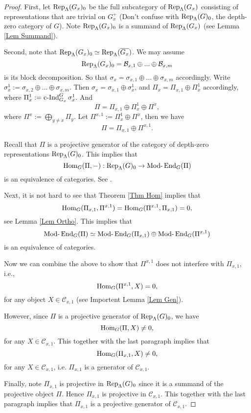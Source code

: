 	\begin{proof}
		First, let $\operatorname{\operatorname{Rep}}_{\Lambda}(G_x)_0$ be the full subcategory of $\operatorname{\operatorname{Rep}}_{\Lambda}(G_x)$ consisting of representations that are trivial on $G_x^+$ (Don't confuse with $\operatorname{\operatorname{Rep}}_{\Lambda}(G)_0$, the depth-zero category of $G$). Note $\operatorname{\operatorname{Rep}}_{\Lambda}(G_x)_0$ is a summand of $\operatorname{\operatorname{Rep}}_{\Lambda}(G_x)$ (see Lemma \ref{Lem Summand}).
		
		Second, note that $\operatorname{\operatorname{Rep}}_{\Lambda}(G_x)_0 \simeq \operatorname{\operatorname{Rep}}_{\Lambda}(\overline{G_x})$. We may assume $$\operatorname{\operatorname{Rep}}_{\Lambda}(G_x)_0=\mathcal{B}_{x,1} \oplus ... \oplus \mathcal{B}_{x,m}$$
		is its block decomposition. So that $\sigma_x=\sigma_{x,1}\oplus...\oplus\sigma_{x,m}$ accordingly. Write $\sigma_x^1:=\sigma_{x,2}\oplus...\oplus\sigma_{x,m}$. Then $\sigma_x=\sigma_{x,1} \oplus \sigma_x^1$, and $\Pi_x=\Pi_{x,1} \oplus \Pi_x^1$ accordingly, where $\Pi_x^1:=\operatorname{\operatorname{c-Ind}}_{G_x}^G\sigma_x^1$. And
		$$\Pi=\Pi_{x,1}\oplus \Pi_x^1 \oplus \Pi^x,$$
		where $\Pi^x:=\bigoplus_{y \neq x}\Pi_y$. Let $\Pi^{x,1}:=\Pi_x^1 \oplus \Pi^x$, then we have
		$$\Pi=\Pi_{x,1} \oplus \Pi^{x,1}.$$
		
		Recall that $\Pi$ is a projective generator of the category of depth-zero representations $\operatorname{\operatorname{Rep}}_{\Lambda}(G)_0$. This implies that 
		$$\operatorname{\operatorname{Hom}}_G(\Pi, -): \operatorname{\operatorname{Rep}}_{\Lambda}(G)_0 \to \operatorname{Mod-}\operatorname{\operatorname{End}}_G(\Pi)$$
		is an equivalence of categories. See \cite[Lemma 22]{bernsteindraft}.
		
		Next, it is not hard to see that Theorem \ref{Thm Hom} implies that 
		$$\operatorname{\operatorname{Hom}}_G(\Pi_{x,1}, \Pi^{x,1})=\operatorname{\operatorname{Hom}}_G(\Pi^{x,1}, \Pi_{x,1})=0,$$
		see Lemma \ref{Lem Ortho}. This implies that $$\operatorname{Mod-}\operatorname{\operatorname{End}}_G(\Pi) \simeq \operatorname{Mod-}\operatorname{\operatorname{End}}_G(\Pi_{x,1}) \oplus \operatorname{Mod-}\operatorname{\operatorname{End}}_G(\Pi^{x,1})$$ is an equivalence of categories.
		
		Now we can combine the above to show that $\Pi^{x,1}$ does not interfere with $\Pi_{x,1}$, i.e.,
		$$\operatorname{\operatorname{Hom}}_G(\Pi^{x,1}, X)=0,$$
		for any object $X \in \mathcal{C}_{x,1}$ (see Importent Lemma \ref{Lem Gen}).
		
		However, since $\Pi$ is a projective generator of $\operatorname{\operatorname{Rep}}_{\Lambda}(G)_0$, we have
		$$\operatorname{\operatorname{Hom}}_G(\Pi, X) \neq 0,$$
		for any $X \in \mathcal{C}_{x,1}$. This together with the last paragraph implies that 
		$$\operatorname{\operatorname{Hom}}_G(\Pi_{x,1}, X) \neq 0,$$
		for any $X \in \mathcal{C}_{x,1}$, i.e. $\Pi_{x,1}$ is a generator of $\mathcal{C}_{x,1}$.
		
		Finally, note $\Pi_{x,1}$ is projective in $\operatorname{\operatorname{Rep}}_{\Lambda}(G)_0$ since it is a summand of the projective object $\Pi$. Hence $\Pi_{x,1}$ is projective in $\mathcal{C}_{x,1}$. This together with the last paragraph implies that $\Pi_{x,1}$ is a projective generator of $\mathcal{C}_{x,1}$.
	
		
	\end{proof}
	
